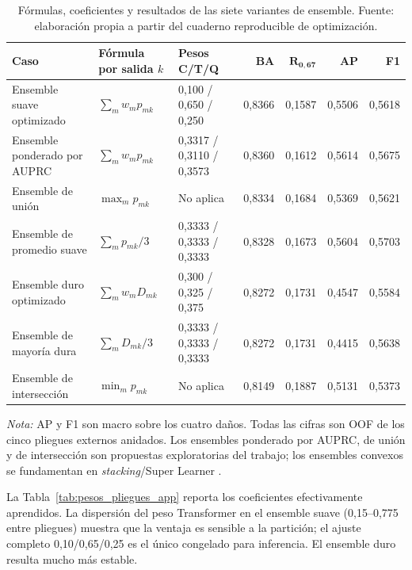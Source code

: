 \begin{table}[H]
\centering
\caption{Fórmulas, coeficientes y resultados de las siete variantes de ensemble. Fuente: elaboración propia a partir del cuaderno reproducible de optimización.}
\label{tab:formulas_ensemble_app}
\small
\begin{tabularx}{\textwidth}{p{39mm}X p{40mm}rrrr}
\toprule
\textbf{Caso} & \textbf{Fórmula por salida $k$} & \textbf{Pesos C/T/Q} & \textbf{BA} & $\boldsymbol{R_{0,67}}$ & \textbf{AP} & \textbf{F1} \\
\midrule
Ensemble suave optimizado & $\sum_m w_mp_{mk}$ & 0,100 / 0,650 / 0,250 & 0,8366 & 0,1587 & 0,5506 & 0,5618 \\
Ensemble ponderado por AUPRC & $\sum_m w_mp_{mk}$ & 0,3317 / 0,3110 / 0,3573 & 0,8360 & 0,1612 & 0,5614 & 0,5675 \\
Ensemble de unión & $\max_m p_{mk}$ & No aplica & 0,8334 & 0,1684 & 0,5369 & 0,5621 \\
Ensemble de promedio suave & $\sum_m p_{mk}/3$ & 0,3333 / 0,3333 / 0,3333 & 0,8328 & 0,1673 & 0,5604 & 0,5703 \\
Ensemble duro optimizado & $\sum_m w_mD_{mk}$ & 0,300 / 0,325 / 0,375 & 0,8272 & 0,1731 & 0,4547 & 0,5584 \\
Ensemble de mayoría dura & $\sum_m D_{mk}/3$ & 0,3333 / 0,3333 / 0,3333 & 0,8272 & 0,1731 & 0,4415 & 0,5638 \\
Ensemble de intersección & $\min_m p_{mk}$ & No aplica & 0,8149 & 0,1887 & 0,5131 & 0,5373 \\
\bottomrule
\end{tabularx}
\begin{minipage}{.98\textwidth}\vspace{1mm}\footnotesize
\emph{Nota:} AP y F1 son macro sobre los cuatro daños. Todas las cifras son OOF de los cinco pliegues externos anidados. Los ensembles ponderado por AUPRC, de unión y de intersección son propuestas exploratorias del trabajo; los ensembles convexos se fundamentan en \emph{stacking}/Super Learner \cite{wolpert1992stacked,vanderlaan2007superlearner}.
\end{minipage}
\end{table}

La Tabla~\ref{tab:pesos_pliegues_app} reporta los coeficientes efectivamente aprendidos. La dispersión del peso Transformer en el ensemble suave (0,15--0,775 entre pliegues) muestra que la ventaja es sensible a la partición; el ajuste completo 0,10/0,65/0,25 es el único congelado para inferencia. El ensemble duro resulta mucho más estable.

